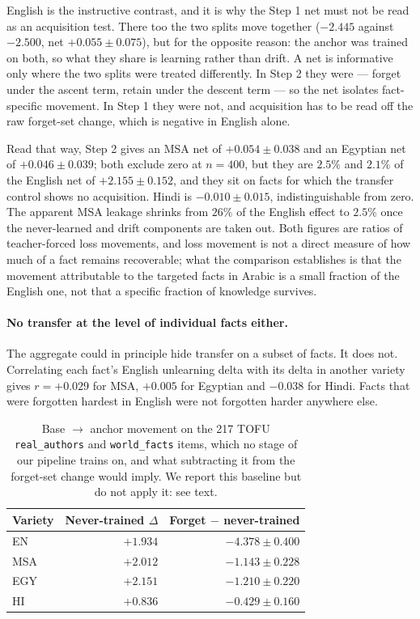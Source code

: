 \documentclass[11pt]{article}
\begin{document}
English is the instructive contrast, and it is why the Step 1 net must not be
read as an acquisition test. There too the two splits move together
($-2.445$ against $-2.500$, net $+0.055 \pm 0.075$), but for the opposite
reason: the anchor was trained on both, so what they share is learning rather
than drift. A net is informative only where the two splits were treated
differently. In Step 2 they were — forget under the ascent term, retain under
the descent term — so the net isolates fact-specific movement. In Step 1 they
were not, and acquisition has to be read off the raw forget-set change, which
is negative in English alone.

Read that way, Step 2 gives an MSA net of $+0.054 \pm 0.038$ and an Egyptian
net of $+0.046 \pm 0.039$; both exclude zero at $n=400$, but they are $2.5\%$
and $2.1\%$ of the English net of $+2.155 \pm 0.152$, and they sit on facts
for which the transfer control shows no acquisition. Hindi is
$-0.010 \pm 0.015$, indistinguishable from zero. The apparent MSA leakage
shrinks from $26\%$ of the English effect to $2.5\%$ once the never-learned
and drift components are taken out. Both figures are ratios of teacher-forced
loss movements, and loss movement is not a direct measure of how much of a
fact remains recoverable; what the comparison establishes is that the
movement attributable to the targeted facts in Arabic is a small fraction of
the English one, not that a specific fraction of knowledge survives.

\paragraph{No transfer at the level of individual facts either.}
The aggregate could in principle hide transfer on a subset of facts. It does
not. Correlating each fact's English unlearning delta with its delta in
another variety gives $r = +0.029$ for MSA, $+0.005$ for Egyptian and
$-0.038$ for Hindi. Facts that were forgotten hardest in English were not
forgotten harder anywhere else.

\begin{table}[t]
\centering
\small
\begin{tabular}{lrr}
\toprule
Variety & Never-trained $\Delta$ & Forget $-$ never-trained \\
\midrule
EN  & $+1.934$ & $-4.378 \pm 0.400$ \\
MSA & $+2.012$ & $-1.143 \pm 0.228$ \\
EGY & $+2.151$ & $-1.210 \pm 0.220$ \\
HI  & $+0.836$ & $-0.429 \pm 0.160$ \\
\bottomrule
\end{tabular}
\caption{Base $\rightarrow$ anchor movement on the 217 TOFU
\texttt{real\_authors} and \texttt{world\_facts} items, which no stage of our
pipeline trains on, and what subtracting it from the forget-set change would
imply. We report this baseline but do not apply it: see text.}
\label{tab:drift}
\end{table}
\end{document}
